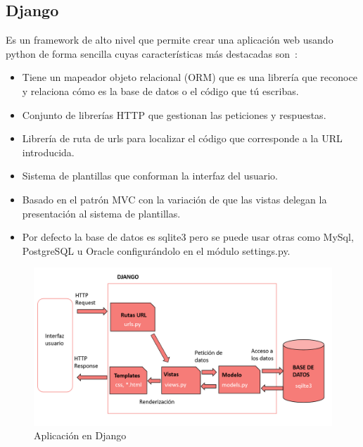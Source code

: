 \documentclass[a4paper, 12pt]{book}
\begin{document}
\subsection{Django}
Es un framework de alto nivel que permite crear una aplicación web usando python de forma sencilla cuyas características más destacadas son~\cite{bennett2009practical}:
\begin{itemize}
    \item Tiene un mapeador objeto relacional (ORM) que es una librería que reconoce y relaciona cómo es la base de datos o el código que tú escribas.
    \item Conjunto de librerías HTTP que gestionan las peticiones y respuestas.
    \item Librería de ruta de urls para localizar el código que corresponde a la URL introducida. 
    \item Sistema de plantillas que conforman la interfaz del usuario.
    \item Basado en el patrón MVC con la variación de que las vistas delegan la presentación al sistema de plantillas.
    \item Por defecto la base de datos es sqlite3 pero se puede usar otras como MySql, PostgreSQL u Oracle configurándolo en el módulo settings.py.
   
\end{itemize}

\begin{figure}[h]
        \centering
        \includegraphics[scale=0.5]{img/django.png}
        \caption{Aplicación en Django }
        \label{figura:appDjango}
\end{figure}
\end{document}
